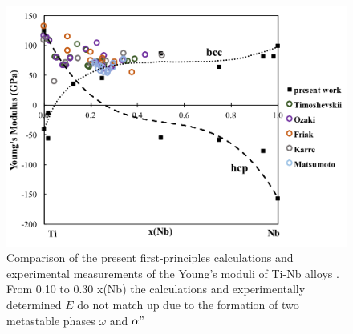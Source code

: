 \newpage
\begin{figure}[H]
	\centering
	\includegraphics[width=\textwidth]{Chapter-1/Figures/TiNbElastic.png}
	\caption{Comparison of the present first-principles calculations and experimental measurements of the Young's moduli of Ti-Nb alloys \cite{Timoshevskii2011,Ozaki2004,Friak2012,Karre2015,Matsumoto2006}. From 0.10 to 0.30 x(Nb) the calculations and experimentally determined $E$ do not match up due to the formation of two metastable phases $\omega$ and $\alpha"$}
	\label{Ch1-figure:tinbelasitc}
\end{figure}
